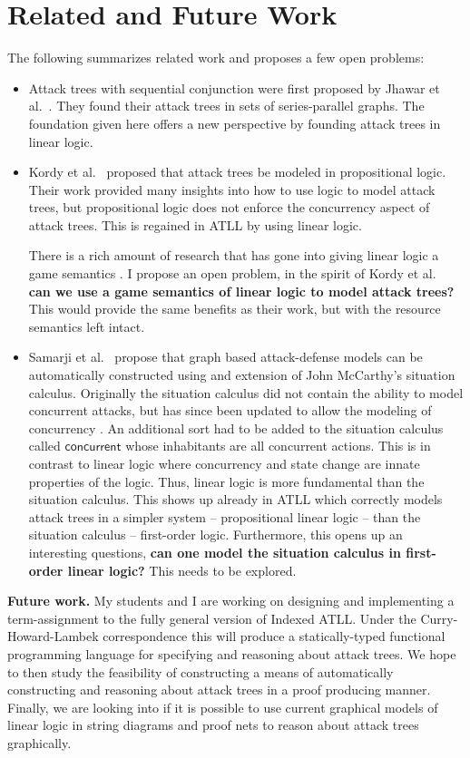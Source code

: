 \documentclass{llncs}
\begin{document}
\section{Related and Future Work}
\label{sec:related_work}
The following summarizes related work and proposes a few open
problems:
\begin{itemize}
\item Attack trees with sequential conjunction were first proposed by
  Jhawar et al.~\cite{Jhawar:2015}.  They found their attack trees in
  sets of series-parallel graphs.  The foundation given here offers a
  new perspective by founding attack trees in linear logic.

\item Kordy et al.~\cite{Kordy2010,Kordy:2012} proposed that attack
  trees be modeled in propositional logic.  Their work provided many
  insights into how to use logic to model attack trees, but
  propositional logic does not enforce the concurrency aspect of
  attack trees.  This is regained in ATLL by using linear logic.

  There is a rich amount of research that has gone into giving linear
  logic a game semantics \cite{Abramsky1999}.  I propose an open
  problem, in the spirit of Kordy et al.~\cite{Kordy2010} \textbf{can
    we use a game semantics of linear logic to model attack trees?}
  This would provide the same benefits as their work, but with the
  resource semantics left intact.
  
\item Samarji et al.~\cite{Samarji2013} propose that graph based
  attack-defense models can be automatically constructed using and
  extension of John McCarthy's situation calculus.  Originally the
  situation calculus did not contain the ability to model concurrent
  attacks, but has since been updated to allow the modeling of
  concurrency \cite{Reiter96naturalactions,Pinto:1994:TRS:921488}. An
  additional sort had to be added to the situation calculus called
  $\mathsf{concurrent}$ whose inhabitants are all concurrent actions.
  This is in contrast to linear logic where concurrency and state
  change are innate properties of the logic.  Thus, linear logic is
  more fundamental than the situation calculus.  This shows up already
  in ATLL which correctly models attack trees in a simpler system --
  propositional linear logic -- than the situation calculus --
  first-order logic.  Furthermore, this opens up an interesting
  questions, \textbf{can one model the situation calculus in first-order
  linear logic?} This needs to be explored.
\end{itemize}
\noindent
\textbf{Future work.} My students and I are working on designing and
implementing a term-assignment to the fully general version of Indexed
ATLL.  Under the Curry-Howard-Lambek correspondence this will produce
a statically-typed functional programming language for specifying and
reasoning about attack trees.  We hope to then study the feasibility
of constructing a means of automatically constructing and reasoning
about attack trees in a proof producing manner.  Finally, we are
looking into if it is possible to use current graphical models of
linear logic in string diagrams and proof nets to reason about attack
trees graphically.
\end{document}

